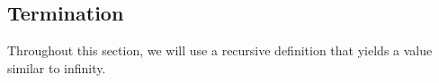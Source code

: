 \subsection{Termination}\label{subsec:Termination}
Throughout this section, we will use a recursive definition that yields a value similar to infinity.


